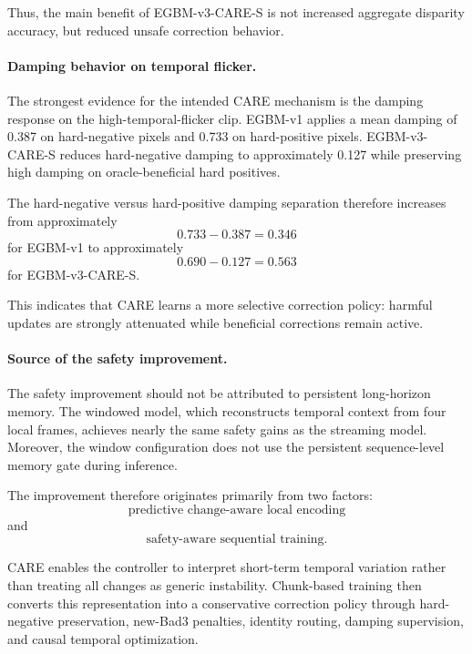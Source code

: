 \documentclass[11pt,a4paper]{article}
\begin{document}
Thus, the main benefit of EGBM-v3-CARE-S is not increased aggregate disparity
accuracy, but reduced unsafe correction behavior.

\paragraph{Damping behavior on temporal flicker.}
The strongest evidence for the intended CARE mechanism is the damping response
on the high-temporal-flicker clip. EGBM-v1 applies a mean damping of 0.387 on
hard-negative pixels and 0.733 on hard-positive pixels. EGBM-v3-CARE-S reduces
hard-negative damping to approximately 0.127 while preserving high damping on
oracle-beneficial hard positives.

The hard-negative versus hard-positive damping separation therefore increases
from approximately
\begin{equation}
    0.733 - 0.387 = 0.346
\end{equation}
for EGBM-v1 to approximately
\begin{equation}
    0.690
    -
    0.127
    =
    0.563
\end{equation}
for EGBM-v3-CARE-S.

This indicates that CARE learns a more selective correction policy: harmful
updates are strongly attenuated while beneficial corrections remain active.

\paragraph{Source of the safety improvement.}
The safety improvement should not be attributed to persistent long-horizon
memory. The windowed model, which reconstructs temporal context from four local
frames, achieves nearly the same safety gains as the streaming model. Moreover,
the window configuration does not use the persistent sequence-level memory gate
during inference.

The improvement therefore originates primarily from two factors:
\begin{equation}
    \text{predictive change-aware local encoding}
\end{equation}
and
\begin{equation}
    \text{safety-aware sequential training}.
\end{equation}

CARE enables the controller to interpret short-term temporal variation rather
than treating all changes as generic instability. Chunk-based training then
converts this representation into a conservative correction policy through
hard-negative preservation, new-Bad3 penalties, identity routing, damping
supervision, and causal temporal optimization.
\end{document}

